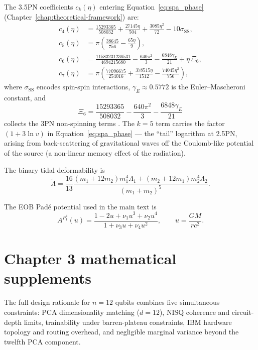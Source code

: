 \documentclass[11pt,a4paper, english]{book}
\theoremstyle{plain}
\theoremstyle{definition}
\numberwithin{equation}{chapter}
\numberwithin{figure}{chapter}
\numberwithin{table}{chapter}
\begin{document}
The 3.5PN coefficients $c_k(\eta)$ entering Equation~\eqref{eq:spa_phase}
(Chapter~\ref{chap:theoretical-framework}) are:
\begin{align}
c_4(\eta) &= \frac{15293365}{508032} + \frac{27145\eta}{504}
             + \frac{3085\eta^2}{72} - 10\sigma_\mathrm{SS}, \\
c_5(\eta) &= \pi\left(\frac{38645}{756} - \frac{65\eta}{9}\right), \\
c_6(\eta) &= \frac{11583231236531}{4694215680} - \frac{640\pi^2}{3}
             - \frac{6848\gamma_E}{21} + \eta\,\Xi_6, \\
c_7(\eta) &= \pi\left(\frac{77096675}{254016} + \frac{378515\eta}{1512}
             - \frac{74045\eta^2}{756}\right),
\end{align}
where $\sigma_\mathrm{SS}$ encodes spin-spin interactions, $\gamma_E
\approx 0.5772$ is the Euler--Mascheroni constant, and
\[
\Xi_6 = \frac{15293365}{508032} - \frac{640\pi^2}{3} - \frac{6848\gamma_E}{21}
\]
collects the 3PN non-spinning terms \cite{Blanchet_2014}. The $k=5$
term carries the factor $(1+3\ln v)$ in Equation~\eqref{eq:spa_phase} —
the ``tail'' logarithm at 2.5PN, arising from back-scattering of
gravitational waves off the Coulomb-like potential of the source (a
non-linear memory effect of the radiation).

The binary tidal deformability is
\begin{equation}
\label{eq:tidal_lambda}
\tilde{\Lambda} = \frac{16}{13}\frac{(m_1+12m_2)m_1^4\Lambda_1
  + (m_2+12m_1)m_2^4\Lambda_2}{(m_1+m_2)^5}.
\end{equation}

The EOB Pad\'e potential used in the main text is
\begin{equation}
\label{eq:pade_A}
A^{P^4_1}(u) = \frac{1 - 2u + \nu_1 u^3 + \nu_2 u^4}
  {1 + \nu_3 u + \nu_4 u^2},
\qquad u = \frac{GM}{rc^2}.
\end{equation}

\section{Chapter 3 mathematical supplements}
\label{app:chap3-math}

The full design rationale for $n=12$ qubits combines five simultaneous
constraints: PCA dimensionality matching ($d=12$), NISQ coherence and
circuit-depth limits, trainability under barren-plateau constraints,
IBM hardware topology and routing overhead, and negligible marginal
variance beyond the twelfth PCA component.
\end{document}
